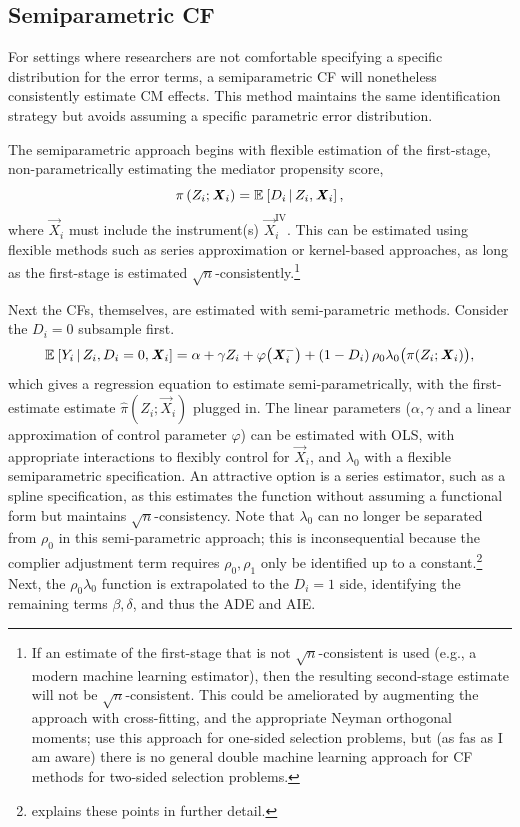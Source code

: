 \subsection{Semiparametric CF}
For settings where researchers are not comfortable specifying a specific distribution for the error terms, a semiparametric CF will nonetheless consistently estimate CM effects.
This method maintains the same identification strategy but avoids assuming a specific parametric error distribution.

The semiparametric approach begins with flexible estimation of the first-stage, non-parametrically estimating the mediator propensity score,
\[ \pi\left(Z_i; \boldsymbol{\mathit{X}}_i \right) = \mathbb{E}_{} \left[ D_i \, \middle\vert \, Z_i, \boldsymbol{\mathit{X}}_i \right], \]
where $\vec X_i$ must include the instrument(s) $\vec X_i^{\text{IV}}$.
This can be estimated using flexible methods such as series approximation or kernel-based approaches, as long as the first-stage is estimated $\sqrt{n}$-consistently.\footnote{
    If an estimate of the first-stage that is not $\sqrt{n}$-consistent is used (e.g., a modern machine learning estimator), then the resulting second-stage estimate will not be $\sqrt{n}$-consistent.
    This could be ameliorated by augmenting the approach with cross-fitting, and the appropriate Neyman orthogonal moments; \cite{bia2024double} use this approach for one-sided selection problems, but (as fas as I am aware) there is no general double machine learning approach for CF methods for two-sided selection problems.  
}

Next the CFs, themselves, are estimated with semi-parametric methods.
Consider the $D_i = 0$ subsample first.
\[ \mathbb{E}_{} \left[ Y_i \, \middle\vert \, Z_i, D_i = 0, \boldsymbol{\mathit{X}}_i \right] =
    \alpha + \gamma Z_i + \varphi\big( \boldsymbol{\mathit{X}}_i^- \big)
    +  \left( 1 - D_i \right) \rho_0 \lambda_0 \big( \pi(Z_i ; \boldsymbol{\mathit{X}}_i) \big), \]
which gives a regression equation to estimate semi-parametrically, with the first-estimate estimate $\hat\pi\left(Z_i; \vec X_i \right)$ plugged in.
The linear parameters ($\alpha, \gamma$ and a linear approximation of control parameter $\varphi$) can be estimated with OLS, with appropriate interactions to flexibly control for $\vec X_i$, and $\lambda_0$ with a flexible semiparametric specification.
An attractive option is a series estimator, such as a spline specification, as this estimates the function without assuming a functional form but maintains $\sqrt n$-consistency.
Note that $\lambda_0$ can no longer be separated from $\rho_0$ in this semi-parametric approach; this is inconsequential because the complier adjustment term requires $\rho_0, \rho_1$ only be identified up to a constant.\footnote{
     explains these points in further detail.
}
Next, the $\rho_0 \lambda_0$ function is extrapolated to the $D_i = 1$ side, identifying the remaining terms $\beta, \delta$, and thus the ADE and AIE.

